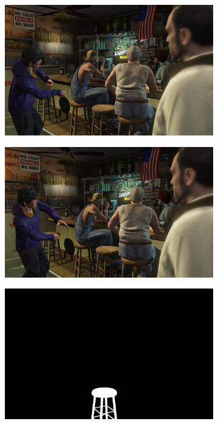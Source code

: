 \begin{figure}
\centering
\begin{subfigure}[t]{0.19\textwidth}
\centering
\includegraphics[scale=0.07]{good_examples/visual_76165_img.png}
\end{subfigure}
\begin{subfigure}[t]{0.19\textwidth}
\centering
\includegraphics[scale=0.07]{good_examples/visual_76165_img1.png}
\end{subfigure}
\begin{subfigure}[t]{0.19\textwidth}
\centering
\includegraphics[scale=0.07]{good_examples/visual_76165_gt.png}

\end{subfigure}
\end{figure}
